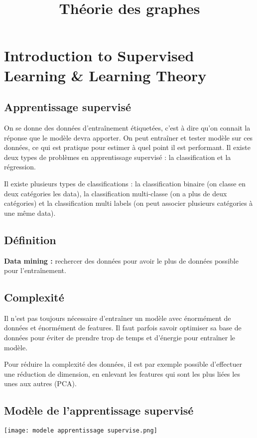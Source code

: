 \documentclass[10pt,a4paper]{article}
\title{Théorie des graphes}
\date{}
\begin{document}
\section*{Introduction to Supervised Learning \& Learning Theory}

\subsection*{Apprentissage supervisé}
On se donne des données d'entraînement étiquetées, c'est à dire qu'on connait la réponse que le modèle devra apporter. On peut entraîner et tester modèle sur ces données, ce qui est pratique pour estimer à quel point il est performant. Il existe deux types de problèmes en apprentissage supervisé : la classification et la régression.

Il existe plusieurs types de classifications : la classification binaire (on classe en deux catégories les data), la classification multi-classe (on a plus de deux catégories) et la classification multi labels (on peut associer plusieurs catégories à une même data).

\subsection*{Définition}

\textbf{Data mining :} rechercer des données pour avoir le plus de données possible pour l'entraînement.

\subsection*{Complexité}

Il n'est pas toujours nécessaire d'entraîner un modèle avec énormément de données et énormément de features. Il faut parfois savoir optimiser sa base de données pour éviter de prendre trop de temps et d'énergie pour entraîner le modèle.

Pour réduire la complexité des données, il est par exemple possible d'effectuer une réduction de dimension, en enlevant les features qui sont les plus liées les unes aux autres (PCA).

\subsection*{Modèle de l'apprentissage supervisé}

\texttt{[image: modele apprentissage supervise.png]}
\end{document}
